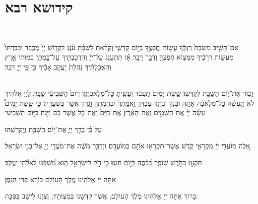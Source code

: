 \documentclass[twoside, openany, parskip=half, 11pt]{book}
\begin{document}

\siyyumshabbatYT

\mournerskaddish

\adonolam

\chapter[קידושא רבא ליו״ט]{ קידושא רבא }

\\\begin{footnotesize}
אִם־תָּשִׁ֤יב מִשַּׁבָּת֙ רַגְלֶ֔ךָ עֲשׂ֥וֹת חֲפָצֶ֖ךָ בְּי֣וֹם קׇדְשִׁ֑י וְקָרָ֨אתָ לַשַּׁבָּ֜ת עֹ֗נֶג לִקְד֤וֹשׁ יְיָ֙ מְכֻבָּ֔ד וְכִבַּדְתּוֹ֙ מֵעֲשׂ֣וֹת דְּרָכֶ֔יךָ מִמְּצ֥וֹא חֶפְצְךָ֖ וְדַבֵּ֥ר דָּבָֽר׃ אָ֗ז תִּתְעַנַּג֙ עַל־יְיָ֔ וְהִרְכַּבְתִּ֖יךָ עַל־בָּ֣מֳתֵי במותי אָ֑רֶץ וְהַאֲכַלְתִּ֗יךָ נַחֲלַת֙ יַֽעֲקֹ֣ב אָבִ֔יךָ כִּ֛י פִּ֥י יְיָ֖ דִּבֵּֽר׃

\veshameru\\
זָכ֛וֹר אֶת־י֥וֹם הַשַּׁבָּ֖ת לְקַדְּשֽׁוֹ׃ שֵׁ֤שֶׁת יָמִים֙ תַּֽעֲבֹ֔ד וְעָשִׂ֖יתָ כׇּל־מְלַאכְתֶּֽךָ׃ וְיוֹם֙ הַשְּׁבִיעִ֔י שַׁבָּ֖ת לַיֽיֳ֣ אֱלֹהֶיךָ לֹא תַֽעֲשֶׂ֨ה כׇל־מְלָאכָ֜ה אַתָּ֣ה וּבִנְךָ֣ וּבִתֶֽךָ עַבְדְּךָ֤ וַֽאֲמָֽתְךָ֙ וּבְהֶמְתֶֽךָ וְגֵֽרְךָ֖ אֲשֶׁ֥ר בִּשְׁעָרֶֽיךָ׃ כִּ֣י שֵֽׁשֶׁת יָמִים֩ עָשָׂ֨ה יְיָ֜ אֶת־הַשָּׁמַ֣יִם וְאֶת־הָאָ֗רֶץ אֶת־הַיָּם֙ וְאֶת־כׇּל־אֲשֶׁר בָּ֔ם וַיָּ֖נַח בַּיּ֣וֹם הַשְּׁבִיעִי\\ \end{footnotesize} עַל כֵּ֗ן בֵּרַ֧ךְ יְיָ֛ אֶת־י֥וֹם הַשַּׁבָּ֖ת וַֽיְקַדְּשֵֽׁהוּ׃

\sepline

  אֵ֚לֶּה מוֹעֲדֵ֣י יְיָ֔ מִקְרָאֵ֖י קֹ֑דֶשׁ אֲשֶׁר־תִּקְרְא֥וּ אֹתָ֖ם בְּמוֹעֲדָֽם׃ וַיְדַבֵּ֣ר מֹשֶׁ֔ה אֶת־מֹֽעֲדֵ֖י יְיָ֑ אֶל־בְּנֵ֖י יִשְׂרָאֵֽל׃

\sepline

  תִּקְע֣וּ בַחֹ֣דֶשׁ שׁוֹפָ֑ר בַּ֝כֵּ֗סֶה לְי֣וֹם חַגֵּֽנוּ׃ כִּ֤י חֹ֣ק לְיִשְׂרָאֵ֣ל ה֑וּא מִ֝שְׁפָּ֗ט לֵאלֹ֘הֵ֥י יַֽעֲקֹֽב׃

\sepline

\savri
{}
אַתָּה יְיָ אֱלֹהֵֽינוּ מֶֽלֶךְ הָעוֹלָם בּוֹרֵא פְּרִי הַגָֽפֶן׃

\sepline

\begin{small}בָּרוּךְ אַתָּה יְיָ אֱלֹהֵינוּ מֶלֶךְ הָעוֹלָם, אֲשֶׁר קִדְּשָׁנוּ בְּמִצְוֹתָיו, וְצִוָּנוּ לֵישֵׁב בַּסֻּכָּה:\end{small} \\
\end{document}
